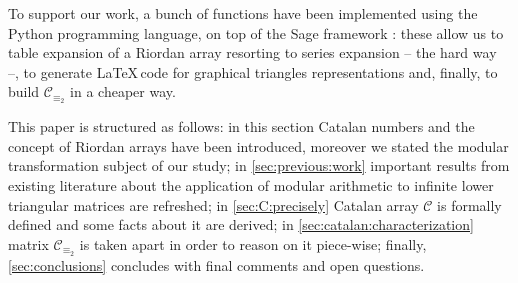 To support our work, a bunch of functions have been implemented using the Python 
programming language, on top of the Sage framework 
\cite{sage}: these allow us to table expansion of a Riordan array
resorting to series expansion -- the hard way --, to generate \LaTeX\,code
for graphical triangles representations and, finally, to build $\mathcal{C}_{\equiv_{2}}$ 
in a cheaper way.




This paper is structured as follows: in this section 
Catalan numbers and the concept of Riordan arrays have been introduced, moreover we stated the modular
transformation subject of our study; in \autoref{sec:previous:work} important
results from existing literature about the application of modular
arithmetic to infinite lower triangular matrices are refreshed;
in \autoref{sec:C:precisely} Catalan array $\mathcal{C}$ is formally defined
and some facts about it are derived; 
in \autoref{sec:catalan:characterization} matrix $\mathcal{C}_{\equiv_{2}}$ is taken apart 
in order to reason on it piece-wise; finally, \autoref{sec:conclusions} concludes
with final comments and open questions.

